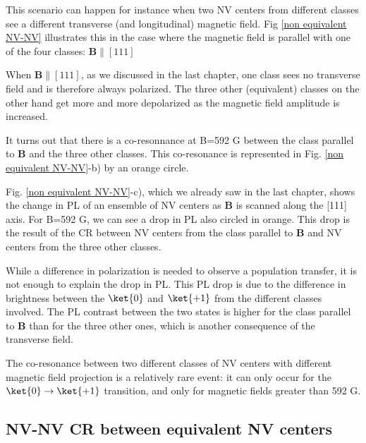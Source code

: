 \documentclass[a4paper,11pt]{report}
\begin{document}
\begin{refsection}
This scenario can happen for instance when two NV centers from different classes see a different transverse (and longitudinal) magnetic field. Fig \ref{non equivalent NV-NV} illustrates this in the case where the magnetic field is parallel with one of the four classes: $\mathbf{B} \parallel [111]$

When $\mathbf{B} \parallel [111]$, as we discussed in the last chapter, one class sees no transverse field and is therefore always polarized. The three other (equivalent) classes on the other hand get more and more depolarized as the magnetic field amplitude is increased. 

It turns out that there is a co-resonnance at B=592 G between the class parallel to $\mathbf{B}$ and the three other classes. This co-resonance is represented in Fig. \ref{non equivalent NV-NV}-b) by an orange circle.

Fig. \ref{non equivalent NV-NV}-c), which we already saw in the last chapter, shows the change in PL of an ensemble of NV centers as $\mathbf{B}$ is scanned along the [111] axis. For B=592 G, we can see a drop in PL also circled in orange. This drop is the result of the CR between NV centers from the class parallel to $\mathbf{B}$ and NV centers from the three other classes. 

While a difference in polarization is needed to observe a population transfer, it is not enough to explain the drop in PL. This PL drop is due to the difference in brightness between the $\ket{0}$ and $\ket{+1}$ from the different classes involved. The PL contrast between the two states is higher for the class parallel to $\mathbf{B}$ than for the three other ones, which is another consequence of the transverse field.

The co-resonance between two different classes of NV centers with different magnetic field projection is a relatively rare event: it can only occur for the $\ket{0} \to \ket{+1}$ transition, and only for magnetic fields greater than 592 G.


\subsection{NV-NV CR between equivalent NV centers}


\end{refsection}
\end{document}
